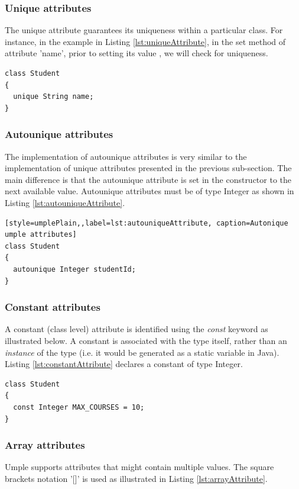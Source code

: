 \subsubsection{Unique attributes}
The unique attribute guarantees its uniqueness within a particular class.
For instance, in the example in Listing \ref{lst:uniqueAttribute}, in the set method of attribute 'name', prior to setting its value , we will check for uniqueness. 

\begin{lstlisting}[style=umplePlain,label=lst:uniqueAttribute, caption=Unique Umple attribute]
class Student 
{
  unique String name;
}
\end{lstlisting}

\subsubsection{Autounique attributes}
The implementation of autounique attributes is very similar to the implementation of unique attributes presented in the previous sub-section. The main difference is that the autounique attribute is set in the constructor to the next available value. Autounique attributes must be of type Integer as shown in Listing \ref{lst:autouniqueAttribute}.

\begin{lstlisting}[style=umplePlain,,label=lst:autouniqueAttribute, caption=Autonique umple attributes]
class Student 
{
  autounique Integer studentId;
}
\end{lstlisting}

\subsubsection{Constant attributes}
A constant (class level) attribute is identified using the \textit{const} keyword as illustrated below. A constant is associated with the type itself, rather than an \textit{instance} of the type (i.e. it would be generated as a static variable in Java). Listing \ref{lst:constantAttribute} declares a constant of type Integer. 

\begin{lstlisting}[style=umplePlain,label=lst:constantAttribute, caption=Constants in Umple]
class Student 
{
  const Integer MAX_COURSES = 10;
}
\end{lstlisting}

\subsubsection{Array attributes}
Umple supports attributes that might contain multiple values. The square brackets notation '[]' is used as illustrated in Listing \ref{lst:arrayAttribute}.

